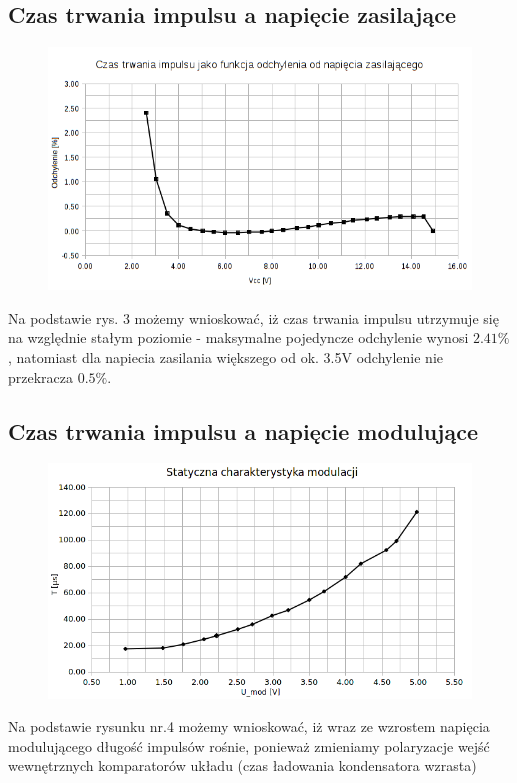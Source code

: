 \documentclass[a4paper,12pt]{article}
\begin{document}
\subsection{Czas trwania impulsu a napięcie zasilające}
\begin{figure}[h]
  \center 
  \includegraphics[width=1.1\textwidth]{charak1}
  \caption{}
\end{figure}
Na podstawie rys. 3 możemy wnioskować, iż czas trwania impulsu utrzymuje się na względnie stałym poziomie - maksymalne pojedyncze odchylenie wynosi
$2.41\%$, natomiast dla napiecia zasilania większego od ok. 3.5V odchylenie nie przekracza $0.5\%$.
\pagebreak
\subsection{Czas trwania impulsu a napięcie modulujące}
\begin{figure}[h]
  \centering
  \includegraphics[width=1.1\textwidth]{charak2}
  \caption{}
\end{figure}
Na podstawie rysunku nr.4 możemy wnioskować, iż wraz ze wzrostem napięcia modulującego długość impulsów rośnie, ponieważ zmieniamy polaryzacje wejść wewnętrznych komparatorów układu (czas ładowania kondensatora wzrasta)
\end{document}
